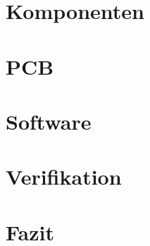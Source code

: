 \documentclass{fhnwreport/fhnwreport}
\begin{document}
\clearpage
\section{Komponenten}
\label{sec:components}



\clearpage
\section{PCB}
\label{sec:pcb}



\clearpage
\section{Software}
\label{sec:software}



\clearpage
\section{Verifikation}
\label{sec:verification}



\clearpage
\section{Fazit}
\label{sec:conclusion}



%
\end{document}
